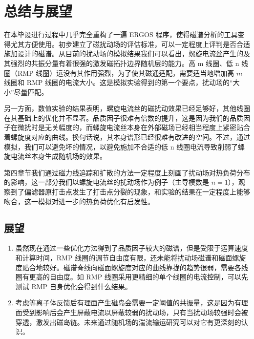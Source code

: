\chapter{总结与展望}

在本毕设进行过程中几乎完全重构了一遍 ERGOS 程序，使得磁谱分析的工具变得尤其方便使用。初步建立了磁扰动场的评估标准，可以一定程度上评判是否合适施加设计的磁谱。从目前的扰动场的模拟结果我们可以看出，螺旋电流丝产生的及其强烈的共振分量有着很强的激发磁拓扑边界随机层的能力。高 m 线圈、低 n 线圈（RMP 线圈）远没有其作用强烈，为了使其磁通适配，需要适当地增加高 $m$ 线圈和 RMP 线圈的电流大小。这是模拟实验得到的第一个要点，扰动场的“大小”尽量匹配。

另一方面，数值实验的结果表明，螺旋电流丝的磁扰动效果已经足够好，其他线圈在其基础上的优化并不显著。品质因子很难有倍数的提升，这是因为我们的品质因子在微扰时是无关幅度的，而螺旋电流丝本身在外部磁场已经相当程度上紧密贴合着螺旋度对应的曲线。换句话说，其本身谱形已经很难有改进的空间。不过，通过模拟，我们可以避免坏的情况，以避免施加不合适的低 n 线圈电流导致削弱了螺旋电流丝本身生成随机场的效果。

第四章节我们通过磁力线追踪和扩散的方法一定程度上刻画了扰动场对热负荷分布的影响，这一部分我们以螺旋电流丝的扰动场作为例子（主导模数是 $n=1$），观察到了偏滤器原打击点发生了打击点分裂的现象，和实验的结果在一定程度上能够吻合，这一模拟对进一步的热负荷优化有启发性。


\section{展望}
\begin{enumerate}
    \item 虽然现在通过一些优化方法得到了品质因子较大的磁谱，但是受限于运算速度和计算时间，RMP 线圈的调节自由度有限，还未能将扰动场磁谱和磁面螺旋度贴合地较好。磁谱脊线向磁面螺旋度对应的曲线靠拢的趋势很弱，需要各线圈有更高的自由度。如 RMP 线圈采用更精细的单个线圈的电流控制，可以先测试 RMP 自身优化会得到什么结果。
    \item 考虑等离子体反馈后有理面产生磁岛会需要一定阈值的共振量，这是因为有理面受到影响后会产生屏蔽电流以屏蔽较弱的扰动场，只有当扰动场较强时会被穿透，激发出磁岛链。未来通过随机场的湍流输运研究可以对它有更深刻的认识。
\end{enumerate}




